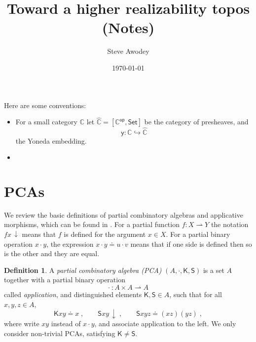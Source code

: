 \documentclass[12pt]{article}
\newcommand{\parto}{\mathrel{\rightharpoonup}}
\newcommand{\cc}{\colon}
\newcommand{\pcacomb}[1]{\mathsf{#1}}
\newcommand{\defined}{\,{\downarrow}}
\newcommand{\combK}{\pcacomb{K}}
\newcommand{\combS}{\pcacomb{S}}
\newcommand{\kleq}{\doteq}
\newcommand{\C}{\ensuremath{\mathbb{C}}}
\newcommand{\op}[1]{\ensuremath{{#1}^{\mathsf{op}}}}
\newcommand{\psh}[1]{\ensuremath{[\op{#1},\mathsf{Set}]}}
\newcommand{\pshat}[1]{\ensuremath{\widehat{#1}}}
\newcommand{\y}{\ensuremath{\mathsf{y}}} %
\newcommand{\hook}{\ensuremath{\hookrightarrow}}
\theoremstyle{remark}
\theoremstyle{definition}
\newtheorem{definition}[theorem]{Definition}
\begin{document}

\title{Toward a higher realizability topos (Notes)}
\author{Steve Awodey}
\date{\today}
\maketitle

Here are some conventions:
%
\begin{itemize}
\item For a small category $\C$ let $\pshat{\C} = \psh{\C}$ be the category of presheaves, and
\[
\y : \C \hook\pshat{\C}
\]
the Yoneda embedding.
%
\item 

\end{itemize}

\section{PCAs}

We review the basic definitions of partial combinatory algebras and applicative morphisms, which can be found in \cite{Hoefstra, completions in realizability}.  For a partial
function $f\cc X \parto Y$  the notation $f x \defined$
means that $f$ is defined for the argument $x\in X$. For a partial binary operation $x\cdot y$,  the expression $x\cdot y\kleq u\cdot v$ means that if one side is defined then so is the other and they are equal. 

\begin{definition}
  A \emph{partial combinatory algebra (PCA)} $(A, \cdot, \combK, \combS)$ is a set $A$ together with a
  partial binary operation 
  \[
  \cdot \ \cc A \times A \parto A
  \]
  called \emph{application}, and distinguished elements $\combK, \combS \in A$,
  such that for all $x, y, z \in A$,
  \begin{equation*}
    \combK x y \kleq x \;,
    \qquad
    \combS x y \defined \;,
    \qquad
    \combS x y z \kleq (x z)(y z) \;,
  \end{equation*}
  where write $x y$ instead of $x \cdot y$,
  and associate application to the left. We only consider
  non-trivial PCAs, satisfying $\combK \neq \combS$.
\end{definition}
\end{document}
